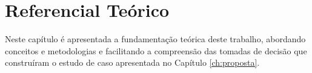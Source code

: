 \chapter{Referencial Teórico}
\label{ch:referencial}

Neste capítulo é apresentada a fundamentação teórica deste trabalho, abordando conceitos e metodologias e facilitando a compreensão das tomadas de decisão que construíram o estudo de caso apresentada no Capítulo \ref{ch:proposta}.

 










